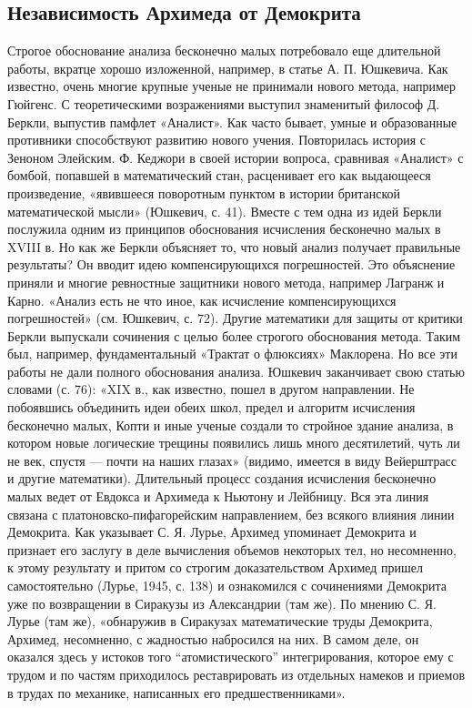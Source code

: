 \subsection{Независимость Архимеда от Демокрита}

Строгое   обоснование  анализа   бесконечно   малых  потребовало   еще
длительной работы, вкратце хорошо изложенной, например, в статье А. П.
Юшкевича.  Как  известно, очень  многие  крупные  ученые не  принимали
нового  метода,   например  Гюйгенс.  С   теоретическими  возражениями
выступил знаменитый философ Д. Беркли, выпустив памфлет «Аналист». Как
часто бывает,  умные и  образованные противники  способствуют развитию
нового учения.  Повторилась история с  Зеноном Элейским. Ф.  Кеджори в
своей  истории  вопроса,  сравнивая  «Аналист» с  бомбой,  попавшей  в
математический  стан,  расценивает  его как  выдающееся  произведение,
«явившееся  поворотным  пунктом  в истории  британской  математической
мысли» (Юшкевич,  с. 41). Вместе с  тем одна из идей  Беркли послужила
одним  из принципов  обоснования исчисления  бесконечно малых  в XVIII
в.  Но  как  же  Беркли   объясняет  то,  что  новый  анализ  получает
правильные результаты?  Он вводит идею  компенсирующихся погрешностей.
Это объяснение  приняли и  многие ревностные защитники  нового метода,
например Лагранж  и Карно.  «Анализ есть не  что иное,  как исчисление
компенсирующихся погрешностей» (см. Юшкевич, с. 72). Другие математики
для  защиты  от  критики  Беркли выпускали  сочинения  с  целью  более
строгого  обоснования  метода.  Таким был,  например,  фундаментальный
«Трактат  о флюксиях»  Маклорена. Но  все эти  работы не  дали полного
обоснования анализа. Юшкевич заканчивает  свою статью словами (с. 76):
«XIX  в., как  известно,  пошел в  другом  направлении. Не  побоявшись
объединить идеи  обеих школ,  предел и алгоритм  исчисления бесконечно
малых,  Копти и  иные ученые  создали  то стройное  здание анализа,  в
котором  новые логические  трещины появились  лишь много  десятилетий,
чуть ли не  век, спустя --- почти на наших  глазах» (видимо, имеется в
виду  Вейерштрасс и  другие математики).  Длительный процесс  создания
исчисления  бесконечно малых  ведет от  Евдокса и  Архимеда к  Ньютону
и  Лейбницу.   Вся  эта  линия  связана   с  платоновско-пифагорейским
направлением, без всякого влияния линии Демокрита. Как указывает С. Я.
Лурье,  Архимед упоминает  Демокрита  и признает  его  заслугу в  деле
вычисления объемов  некоторых тел,  но несомненно, к  этому результату
и  притом со  строгим  доказательством  Архимед пришел  самостоятельно
(Лурье, 1945,  с. 138)  и ознакомился с  сочинениями Демокрита  уже по
возвращении в Сиракузы из Александрии (там  же). По мнению С. Я. Лурье
(там  же),  «обнаружив  в Сиракузах  математические  труды  Демокрита,
Архимед, несомненно, с  жадностью набросился на них. В  самом деле, он
оказался  здесь  у  истоков того  ``атомистического''  интегрирования,
которое  ему  с  трудом  и по  частям  приходилось  реставрировать  из
отдельных  намеков и  приемов  в трудах  по  механике, написанных  его
предшественниками».

